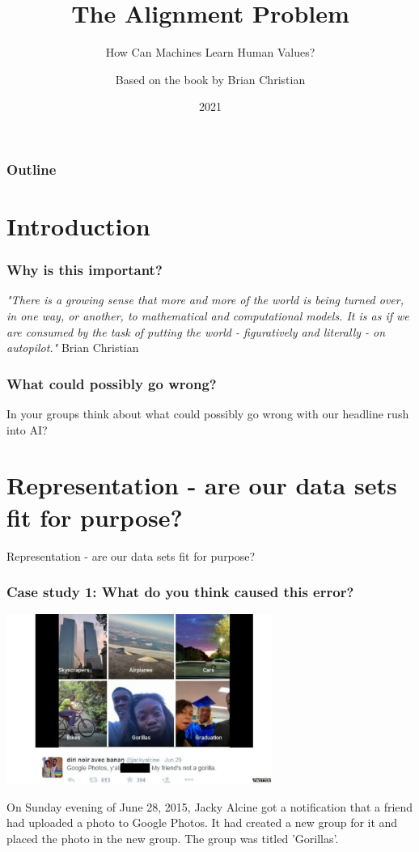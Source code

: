 \documentclass{beamer}
\title{The Alignment Problem}
\subtitle{How Can Machines Learn Human Values?}
\author{Based on the book by Brian Christian}
\date{2021}
\begin{document}
\frame{\titlepage}


\begin{frame}
\frametitle{Outline}
\tableofcontents
\end{frame}

\section{Introduction}

\begin{frame}
\frametitle{Why is this important?}
\emph{"There is a growing sense that more and more of the world is being turned over, in one way, or another, to mathematical and computational models. It is as if we are consumed by the task of putting the world - figuratively and literally - on autopilot."} Brian Christian
\end{frame}

\begin{frame}
\frametitle{What could possibly go wrong?}
In your groups think about what could possibly go wrong with our headline rush into AI?
\end{frame}


\section[Representation]{Representation - are our data sets fit for purpose?}

\begin{frame}
Representation - are our data sets fit for purpose?
\end{frame}


\begin{frame}
\frametitle{Case study 1: What do you think caused this error?}
\begin{center}
\includegraphics[width=0.65\textwidth]{./images/gorillas.jpg}
\end{center}
On Sunday evening of June 28, 2015, Jacky Alcine got a notification that a friend had uploaded a photo to Google Photos. It had created a new group for it and placed the photo in the new group. The group was titled 'Gorillas'.
\end{frame}
\end{document}
